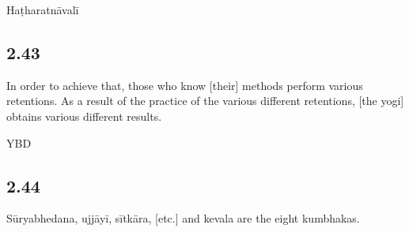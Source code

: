 \begin{ekdosis}
\begin{testimonia}[hp02_042]
Haṭharatnāvalī

\begin{versinnote}
\end{versinnote}
\end{testimonia}

\begin{philcomm}[hp02_042]
\end{philcomm}

\subsection*{2.43}
\begin{translation}[hp02_043]
In order to achieve that, those who know [their] methods perform various retentions. As a result of the practice of the various different retentions, [the yogi] obtains various different results.
\end{translation}

\begin{sources}[hp02_043]
\end{sources}

\begin{testimonia}[hp02_043]
YBD

\begin{versinnote}
\end{versinnote}
\end{testimonia}

\begin{philcomm}[hp02_043]

\end{philcomm}

\subsection*{2.44}
\begin{translation}[hp02_044]
Sūryabhedana, ujjāyī, sītkāra, [etc.] and kevala are the eight kumbhakas.
\end{translation}

\begin{sources}[hp02_044]
\end{sources}


\end{ekdosis}
